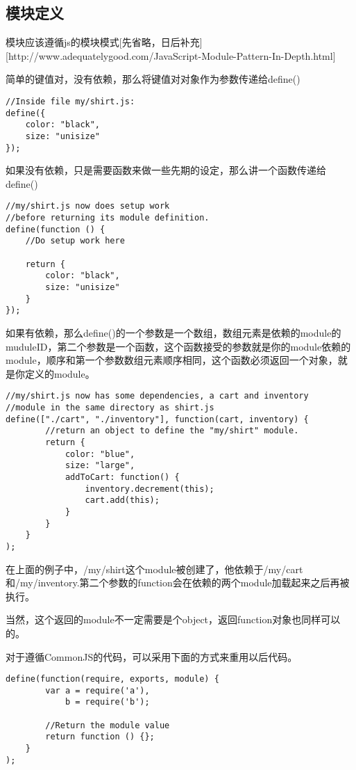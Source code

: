 \subsection{模块定义}
模块应该遵循js的模块模式[先省略，日后补充][http://www.adequatelygood.com/JavaScript-Module-Pattern-In-Depth.html]

简单的键值对，没有依赖，那么将键值对对象作为参数传递给define()

\begin{lstlisting}
//Inside file my/shirt.js:
define({
    color: "black",
    size: "unisize"
});
\end{lstlisting}

    如果没有依赖，只是需要函数来做一些先期的设定，那么讲一个函数传递给define()
    \begin{lstlisting}
//my/shirt.js now does setup work
//before returning its module definition.
define(function () {
    //Do setup work here

    return {
        color: "black",
        size: "unisize"
    }
});
    \end{lstlisting}

    如果有依赖，那么define()的一个参数是一个数组，数组元素是依赖的module的muduleID，第二个参数是一个函数，这个函数接受的参数就是你的module依赖的module，顺序和第一个参数数组元素顺序相同，这个函数必须返回一个对象，就是你定义的module。

    \begin{lstlisting}
//my/shirt.js now has some dependencies, a cart and inventory
//module in the same directory as shirt.js
define(["./cart", "./inventory"], function(cart, inventory) {
        //return an object to define the "my/shirt" module.
        return {
            color: "blue",
            size: "large",
            addToCart: function() {
                inventory.decrement(this);
                cart.add(this);
            }
        }
    }
);
    \end{lstlisting}

    在上面的例子中，/my/shirt这个module被创建了，他依赖于/my/cart和/my/inventory.第二个参数的function会在依赖的两个module加载起来之后再被执行。

    当然，这个返回的module不一定需要是个object，返回function对象也同样可以的。

    对于遵循CommonJS的代码，可以采用下面的方式来重用以后代码。

    \begin{lstlisting}
define(function(require, exports, module) {
        var a = require('a'),
            b = require('b');

        //Return the module value
        return function () {};
    }
);
    \end{lstlisting}

